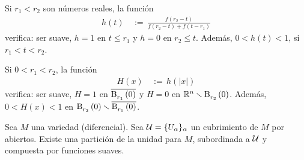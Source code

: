 \begin{lemaParticiones}\label{lema:particiones:escalonsuave}
	Si $r_1<r_2$ son n\'{u}meros reales, la funci\'{o}n
	\begin{align*}
		h(t) & \,:=\,\frac{f(r_2-t)}{f(r_2-t)+f(t-r_1)}
	\end{align*}
	verifica: ser suave, $h=1$ en $t\leq r_1$ y $h=0$ en $r_2\leq t$.
	Adem\'{a}s, $0<h(t)<1$, si $r_1<t<r_2$.
\end{lemaParticiones}

\begin{lemaParticiones}\label{lema:particiones:chichonsuave}
	Si $0<r_1<r_2$, la funci\'{o}n
	\begin{align*}
		H(x) & \,:=\,h(|x|)
	\end{align*}
	verifica: ser suave, $H=1$ en $\clos{\bola{r_1}{0}}$ y $H=0$ en
	$\bb R^n\setmin\bola{r_2}{0}$. Adem\'{a}s, $0<H(x)<1$ en
	$\bola{r_2}{0}\setmin\clos{\bola{r_1}{0}}$.
\end{lemaParticiones}

\begin{teoParticiones}%
	\label{thm:particiones}
	Sea $M$ una variedad (diferencial). Sea $\cal U=\{U_\alpha\}_\alpha$ un
	cubrimiento de $M$ por abiertos. Existe una partici\'{o}n de la unidad
	para $M$, subordinada a $\cal U$ y compuesta por funciones suaves.
\end{teoParticiones}

